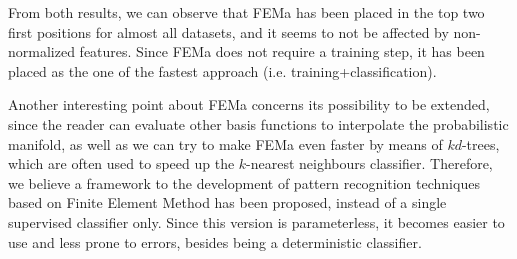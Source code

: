 From both results, we can observe that FEMa has been placed in the top two first positions for almost all datasets, and it seems to not be affected by non-normalized features. Since FEMa does not require a training step, it has been placed as the one of the fastest approach (i.e. training+classification).

Another interesting point about FEMa concerns its possibility to be extended, since the reader can evaluate other basis functions to interpolate the probabilistic manifold, as well as we can try to make FEMa even faster by means of $kd$-trees, which are often used to speed up the $k$-nearest neighbours classifier. Therefore, we believe a framework to the development of pattern recognition techniques based on Finite Element Method has been proposed, instead of a single supervised classifier only. Since this version is parameterless, it becomes easier to use and less prone to errors, besides being a deterministic classifier.